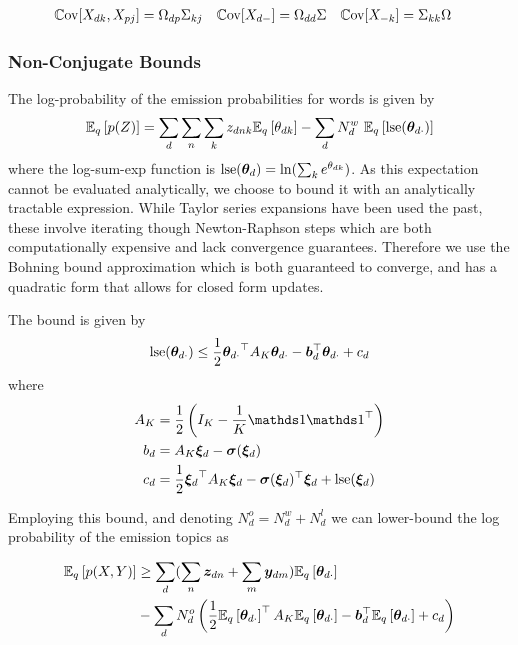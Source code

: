 \begin{align}
\cov{X_{dk}, X_{pj}} & = \Omega_{dp} \Sigma_{kj} &
\cov{X_{d-}} & = \Omega_{dd} \Sigma &
\cov{X_{-k}} & = \Sigma_{kk} \Omega \label{eqn:sep-cov-forms}
\end{align}

\subsubsection*{Non-Conjugate Bounds}
The log-probability of the emission probabilities for words is given by
\begin{align}
\ex{p(Z)}{q} = \sum_d \sum_n \sum_k \zdnk \ex{\thdk}{q} - \sum_d N^w_d \text{ }\ex{\lse(\thdo)}{q}
\end{align}
where the log-sum-exp function is $\lse(\thd) = \ln (\sum_k e^\thdk)$. As this expectation cannot be evaluated analytically, we choose to bound it with an analytically tractable expression. While Taylor series expansions have been used the past\cite{Blei2006}\cite{Wang2013a}, these involve iterating though Newton-Raphson steps which are both computationally expensive and lack convergence guarantees. Therefore we use the Bohning bound approximation\cite{Bohning1988} which is both guaranteed to converge, and has a quadratic form that allows for closed form updates.

The bound is given by
\begin{align}
\lse(\thdo) \leq \half \thdo\T A_K \thdo - \vv{b}_d\T\thdo + c_d \label{eqn:lse-def}
\end{align}
where
\begin{align}
A_K & = \half \left( I_K - \frac{1}{K} \one \one\T \right) \\
b_d & = A_K \Ed - \vv{\sigma}(\Ed) \label{eqn:bohning-b} \\
c_d & = \frac{1}{2} \Ed\T A_K \Ed - \vv{\sigma}(\Ed)\T\Ed + \lse(\Ed) \label{eqn:bohning-c}
\end{align}

Employing this bound, and denoting $N^o_d = N^w_d + N^l_d$ we can lower-bound the log probability of the emission topics as

\begin{equation}
\begin{aligned}
\ex{p(X,Y)}{q} & \geq \sum_d  (\sum_n \vv{z}_{dn} + \sum_m \vv{y}_{dm}) \ex{\thdo}{q} \\
   & - \sum_d N^o_d \left(\half \ex{\thdo}{q}\T A_K \ex{\thdo}{q} - \vv{b}_d\T\ex{\thdo}{q} + c_d\right)
\end{aligned}
\end{equation}


